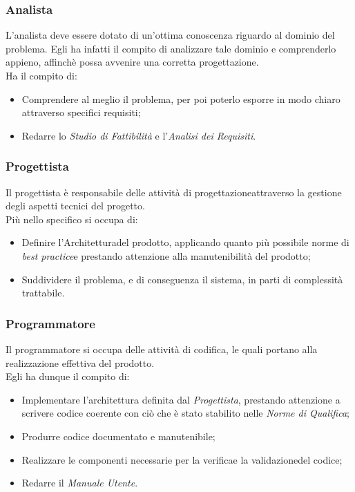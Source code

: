 \subsubsection{Analista}
	L'analista deve essere dotato di un'ottima conoscenza riguardo al dominio del problema. Egli ha infatti il 					compito di analizzare tale dominio e comprenderlo appieno, affinchè possa avvenire una corretta 											progettazione\glossario.\\
	Ha il compito di:
	\begin{itemize}
	\item Comprendere al meglio il problema, per poi poterlo esporre in modo chiaro attraverso specifici 									requisiti\glossario;
	\item Redarre lo \textit{Studio di Fattibilità} e l'\textit{Analisi dei Requisiti}\glossario.
	\end{itemize}

\subsubsection{Progettista}
	Il progettista è responsabile delle attività di progettazione\glossario attraverso la gestione degli aspetti tecnici 	del progetto\glossario.\\
	Più nello specifico si occupa di:
	\begin{itemize}
	\item Definire l'Architettura\glossario del prodotto\glossario, applicando quanto più possibile norme di 							\textit{best practice}\glossario e prestando attenzione alla manutenibilità del prodotto\glossario;
	\item Suddividere il problema, e di conseguenza il sistema, in parti di complessità trattabile.
	\end{itemize}

\subsubsection{Programmatore}
	Il programmatore si occupa delle attività di codifica, le quali portano alla realizzazione effettiva del 						prodotto\glossario.\\
	Egli ha dunque il compito di:
	\begin{itemize}
	\item Implementare l'architettura definita dal \textit{Progettista}, prestando attenzione a scrivere codice 						coerente con ciò che è stato stabilito nelle \textit{Norme di Qualifica};
	\item Produrre codice documentato e manutenibile;
	\item Realizzare le componenti necessarie per la verifica\glossario e la validazione\glossario del codice;
	\item Redarre il \textit{Manuale Utente}.
	\end{itemize}

